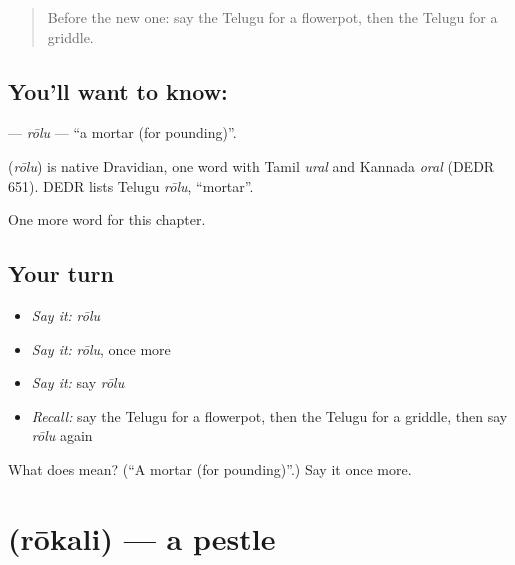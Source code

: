 \label{lesson:TE-C270-rolu}



\begin{quote}
Before the new one: say the Telugu for a flowerpot, then the Telugu for a griddle.
\end{quote}

\subsection*{You'll want to know: }
\textbf{} — \emph{rōlu} — \textquotedblleft{}a mortar (for pounding)\textquotedblright{}.

\begin{cousinweb}
\textbf{} (\emph{rōlu}) is native Dravidian, one word with Tamil \emph{ural} and Kannada \emph{oral} (DEDR 651). DEDR lists Telugu \emph{rōlu}, \textquotedblleft{}mortar\textquotedblright{}.
\end{cousinweb}

\begin{grammarlens}[title={What you've built}]
One more word for this chapter.
\end{grammarlens}

\subsection*{Your turn}
\begin{itemize}
\raggedright
  \item \emph{Say it:} \emph{rōlu}
  \item \emph{Say it:} \emph{rōlu}, once more
  \item \emph{Say it:} say \emph{rōlu}
  \item \emph{Recall:} say the Telugu for a flowerpot, then the Telugu for a griddle, then say \emph{rōlu} again
\end{itemize}

\begin{tcolorbox}[breakable,colback=teal!4,colframe=teal!35!black,title={Before you move on}]
What does  mean? (\textquotedblleft{}A mortar (for pounding)\textquotedblright{}.) Say it once more.
\end{tcolorbox}
\section[\texorpdfstring{\te{రోకలి} (rōkali)}{రోకలి (rōkali)}]{ (rōkali) — a pestle}

\label{lesson:TE-C270-rokali}



